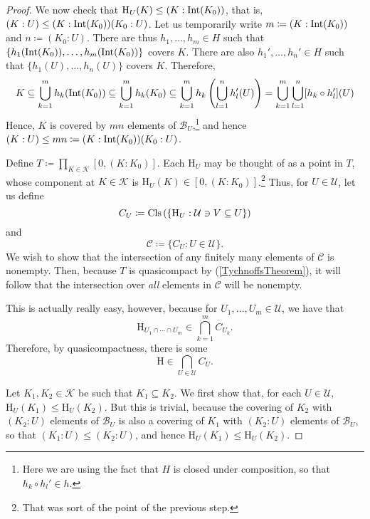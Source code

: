 \begin{thm}
\begin{savenotes}
\begin{proof}
We now check that $\mathrm{H}_U(K)\leq (K:\operatorname{Int} (K_0))$, that is, $(K:U)\leq (K:\operatorname{Int} (K_0))(K_0:U)$.  Let us temporarily write $m\coloneqq (K:\operatorname{Int} (K_0))$ and $n\coloneqq (K_0:U)$.  There are thus $h_1,\ldots ,h_m\in H$ such that $\{ h_1(\operatorname{Int} (K_0)),\ldots ,h_m(\operatorname{Int} (K_0))\}$ covers $K$.  There are also $h_1',\ldots ,h_n'\in H$ such that $\{ h_1(U),\ldots ,h_n(U)\}$ covers $K$.  Therefore,
\begin{equation}
K\subseteq \bigcup _{k=1}^mh_k(\operatorname{Int} (K_0))\subseteq \bigcup _{k=1}^mh_k(K_0)\subseteq \bigcup _{k=1}^mh_k\left( \bigcup _{l=1}^nh_l'(U)\right) =\bigcup _{k=1}^m\bigcup _{l=1}^n[h_k\circ h_l'](U)
\end{equation}
Hence, $K$ is covered by $mn$ elements of $\mathcal{B}_U$,\footnote{Here we are using the fact that $H$ is closed under composition, so that $h_k\circ h_l'\in h$.} and hence $(K:U)\leq mn\coloneqq (K:\operatorname{Int} (K_0))(K_0:U)$.

Define $T\coloneqq \prod _{K\in \mathcal{K}}[0,(K:K_0)]$.  Each $\mathrm{H}_U$ may be thought of as a point in $T$, whose component at $K\in \mathcal{K}$ is $\mathrm{H}_U(K)\in [0,(K:K_0)]$.\footnote{That was sort of the point of the previous step.}  Thus, for $U\in \mathcal{U}$, let us define
\begin{equation}
C_U\coloneqq \operatorname{Cls} \left( \left\{ \mathrm{H}_U:\mathcal{U}\ni V\subseteq U\right\} \right) 
\end{equation}
and
\begin{equation}
\mathcal{C}\coloneqq \{ C_U:U\in \mathcal{U}\} .
\end{equation}
We wish to show that the intersection of any finitely many elements of $\mathcal{C}$ is nonempty.  Then, because $T$ is quasicompact by  (\cref{TychnoffsTheorem}), it will follow that the intersection over \emph{all} elements in $\mathcal{C}$ will be nonempty.

This is actually really easy, however, because for $U_1,\ldots ,U_m\in \mathcal{U}$, we have that
\begin{equation}
\mathrm{H}_{U_1\cap \cdots \cap U_m}\in \bigcap _{k=1}^mC_{U_k}.
\end{equation}
Therefore, by quasicompactness, there is some
\begin{equation}
\mathrm{H}\in \bigcap _{U\in \mathcal{U}}C_U.
\end{equation}

\label{Haar.4}
Let $K_1,K_2\in \mathcal{K}$ be such that $K_1\subseteq K_2$.  We first show that, for each $U\in \mathcal{U}$, $\mathrm{H}_U(K_1)\leq \mathrm{H}_U(K_2)$.  But this is trivial, because the covering of $K_2$ with $(K_2:U)$ elements of $\mathcal{B}_U$ is also a covering of $K_1$ with $(K_2:U)$ elements of $\mathcal{B}_U$, so that $(K_1:U)\leq (K_2:U)$, and hence $\mathrm{H}_U(K_1)\leq \mathrm{H}_U(K_2)$.


\end{proof}
\end{savenotes}
\end{thm}
